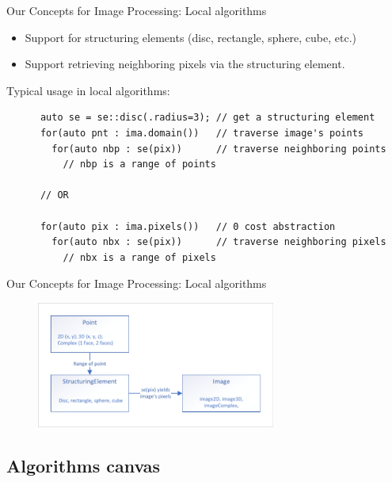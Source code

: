 \documentclass[12pt,aspectratio=169]{beamer}
\begin{document}
\begin{frame}[fragile]{Our Concepts for Image Processing: Local algorithms}
  \begin{itemize}
    \item Support for structuring elements (disc, rectangle, sphere, cube, etc.)
    \item Support retrieving neighboring pixels via the structuring element.
  \end{itemize}
  Typical usage in local algorithms:

  \begin{verbatim}
      auto se = se::disc(.radius=3); // get a structuring element
      for(auto pnt : ima.domain())   // traverse image's points
        for(auto nbp : se(pix))      // traverse neighboring points
          // nbp is a range of points

      // OR

      for(auto pix : ima.pixels())   // 0 cost abstraction
        for(auto nbx : se(pix))      // traverse neighboring pixels
          // nbx is a range of pixels
  \end{verbatim}
\end{frame}

\begin{frame}[fragile]{Our Concepts for Image Processing: Local algorithms}
  \centering
  \begin{figure}
    \includegraphics[width=0.7\textwidth]{../figures/concepts/se_extension_rework}
  \end{figure}
\end{frame}

\subsection{Algorithms canvas}
\end{document}
